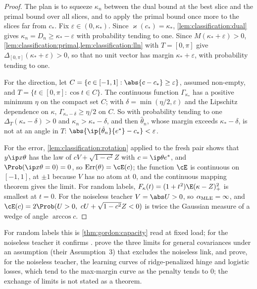 \begin{refsection}
\begin{proof}
The plan is to squeeze $\kappa_n$ between the dual bound at the best slice and the primal bound over all slices, and to apply the primal bound once more to the slices far from $c_*$. Fix $\varepsilon\in(0,\kappa_*)$. Since $\varkappa(c_*)=\kappa_*$, \cref{lem:classification:dual} gives $\kappa_n=D_n\ge\kappa_*-\varepsilon$ with probability tending to one. Since $M(\kappa_*+\varepsilon)>0$, \cref{lem:classification:primal,lem:classification:lln} with $T=[0,\pi]$ give $\Delta_{[0,\pi]}(\kappa_*+\varepsilon)>0$, so that no unit vector has margin $\kappa_*+\varepsilon$, with probability tending to one.

For the direction, let $C=\{c\in[-1,1]:\abs{c-c_*}\ge\varepsilon\}$, assumed non-empty, and $T=\{t\in[0,\pi]:\cos t\in C\}$. The continuous function $\Gamma_{\kappa_*}$ has a positive minimum $\eta$ on the compact set $C$; with $\delta=\min(\eta/2,\varepsilon)$ and the Lipschitz dependence on $\kappa$, $\Gamma_{\kappa_*-\delta}\ge\eta/2$ on $C$. So with probability tending to one $\Delta_T(\kappa_*-\delta)>0$ and $\kappa_n>\kappa_*-\delta$, and then $\hat\theta_n$, whose margin exceeds $\kappa_*-\delta$, is not at an angle in $T$: $\abs{\ip{\hat\theta_n}{e^*}-c_*}<\varepsilon$.

For the error, \cref{lem:classification:rotation} applied to the fresh pair shows that $y\ip x\theta$ has the law of $cV+\sqrt{1-c^2}Z$ with $c=\ip\theta{e^*}$, and $\Prob(\ip x\theta=0)=0$, so $\classificationerr(\theta)=\cE(c)$; the function $\cE$ is continuous on $[-1,1]$, at $\pm1$ because $V$ has no atom at $0$, and the continuous mapping theorem gives the limit. For random labels, $F_\kappa(t)=(1+t^2)\E(\kappa-Z)_+^2$ is smallest at $t=0$. For the noiseless teacher $V=\abs U>0$, so $\alpha_{\mathrm{MLE}}=\infty$, and $\cE(c)=2\Prob(U>0,\ cU+\sqrt{1-c^2}Z<0)$ is twice the Gaussian measure of a wedge of angle $\arccos c$.
\end{proof}

For random labels this is \cref{thm:gordon:capacity} read at fixed load; for the noiseless teacher it confirms \textcite{OpperEtAl1990}. \Textcite{MontanariEtAl2025} prove the three limits for general covariances under an assumption (their Assumption~3) that excludes the noiseless link, and \textcite{AubinEtAl2020} prove, for the noiseless teacher, the learning curves of ridge-penalized hinge and logistic losses, which tend to the max-margin curve as the penalty tends to $0$; the exchange of limits is not stated as a theorem.


\end{refsection}
